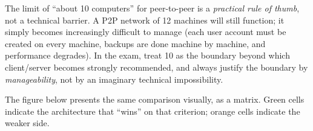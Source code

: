 \documentclass[11pt]{article}
\begin{document}
\begin{attention}
The limit of ``about 10 computers'' for peer-to-peer is a \emph{practical rule of thumb}, not a technical barrier. A P2P network of 12 machines will still function; it simply becomes increasingly difficult to manage (each user account must be created on every machine, backups are done machine by machine, and performance degrades). In the exam, treat 10 as the boundary beyond which client/server becomes strongly recommended, and always justify the boundary by \emph{manageability}, not by an imaginary technical impossibility.
\end{attention}

The figure below presents the same comparison visually, as a matrix. Green cells indicate the architecture that ``wins'' on that criterion; orange cells indicate the weaker side.
\end{document}
